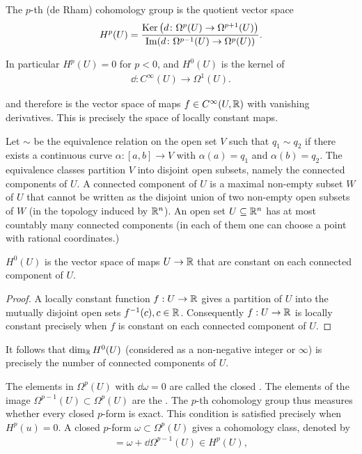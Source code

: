 \begin{definition}\label{def:3-8}
The $p$-th (de Rham) cohomology group is the quotient vector space
\begin{align*}
  H^p(U) 
  = \frac {\operatorname{Ker}\big(d\colon\Omega^p(U)\to\Omega^{p+1}(U)\big)}
          {\operatorname{Im}(d\colon\Omega^{p-1}(U)\to\Omega^p(U))}.
\end{align*}

In particular $H^p(U) = 0$ for $p<0$, and $H^0(U)$ is the kernel of
\begin{align*}
  \dd:C^\infty(U)\to\Omega^1(U).
\end{align*}

and therefore is the vector space of maps $f\in C^\infty(U, \mathbb{R})$ with vanishing 
derivatives. This is precisely the space of locally constant maps.

Let $\sim$ be the equivalence relation on the open set $V$ such that $q_1\sim q_2$ if there
exists a continuous curve $\alpha: [a, b]\to V$ with $\alpha(a) = q_1$ and $\alpha(b) = q_2$. The
equivalence classes partition $V$ into disjoint open subsets, namely the connected components of $U$. 
A connected component of $U$ is a maximal non-empty subset $W$ of $U$ that cannot be written as the 
disjoint union of two non-empty open subsets of $W$ (in the topology induced by $\mathbb{R}^n$). An open 
set $U\subseteq\mathbb{R}^n$ has at most countably many connected components (in each of them one can choose 
a point with rational coordinates.)
\end{definition}



\begin{lemma}\label{lemma:3-9}
  $H^0(U)$ is the vector space of maps $U\to \mathbb{R}$ that are constant on each
connected component of $U$.
\end{lemma}

\begin{proof}
  A locally constant function $f:U\to\mathbb{R}$ gives a partition of $U$ into the
mutually disjoint open sets $f^{-1}(c), c\in\mathbb{R}$. Consequently $f:U\to\mathbb{R}$ is locally
constant precisely when $f$ is constant on each connected component of $U$.
\end{proof}

It follows that $\dim_{\mathbb{R}} H^0(U)$ (considered as a non-negative integer or $\infty$) is precisely
the number of connected components of $U$.


The elements in $\Omega^p(U)$ with $\dd\omega = 0$ are called the closed . The elements
of the image $\Omega^{p-1}(U)\subset\Omega^p(U)$ are the . The $p$-th cohomology
group thus measures whether every closed $p$-form is exact. This condition is
satisfied precisely when $H^p(u) = 0$. A closed $p$-form $\omega\subset\Omega^p(U)$ gives a
cohomology class, denoted by
\begin{align*}
  [\omega] = \omega + \dd\Omega^{p-1}(U) \in H^p(U),
\end{align*}

